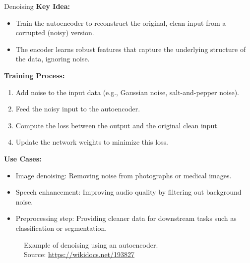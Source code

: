 \begin{frame}[allowframebreaks]{Denoising}
    \textbf{Key Idea:}
    \begin{itemize}
        \item Train the autoencoder to reconstruct the original, clean input from a corrupted (noisy) version.
        \item The encoder learns robust features that capture the underlying structure of the data, ignoring noise.
    \end{itemize}

    \vspace{1em}
    \textbf{Training Process:}
    \begin{enumerate}
        \item Add noise to the input data (e.g., Gaussian noise, salt-and-pepper noise).
        \item Feed the noisy input to the autoencoder.
        \item Compute the loss between the output and the original clean input.
        \item Update the network weights to minimize this loss.
    \end{enumerate}

    \framebreak

    \textbf{Use Cases:}
    \begin{itemize}
        \item Image denoising: Removing noise from photographs or medical images.
        \item Speech enhancement: Improving audio quality by filtering out background noise.
        \item Preprocessing step: Providing cleaner data for downstream tasks such as classification or segmentation.
    \end{itemize}

    \framebreak

    \begin{figure}
        \centering
        \caption*{Example of denoising using an autoencoder.\\ {\scriptsize Source: \url{https://wikidocs.net/193827}}}
    \end{figure}
\end{frame}